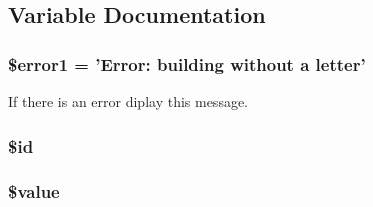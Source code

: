 \subsection{\-Variable \-Documentation}
\hypertarget{header__include_8php_a048e701cb82acbcd5a5015d63db25858}{
\subsubsection[{\$error1}]{\setlength{\rightskip}{0pt plus 5cm}\$error1 = '\-Error\-: building without a letter'}}\label{header__include_8php_a048e701cb82acbcd5a5015d63db25858}
\-If there is an error diplay this message. \hypertarget{header__include_8php_ae97941710d863131c700f069b109991e}{
\subsubsection[{\$id}]{\setlength{\rightskip}{0pt plus 5cm}\$id}}\label{header__include_8php_ae97941710d863131c700f069b109991e}
\hypertarget{header__include_8php_a0f298096f322952a72a50f98a74c7b60}{
\subsubsection[{\$value}]{\setlength{\rightskip}{0pt plus 5cm}\$value}}\label{header__include_8php_a0f298096f322952a72a50f98a74c7b60}
